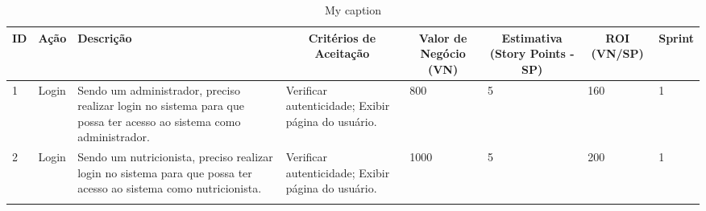 \begin{table}[]
\centering
\caption{My caption}
\label{my-label}
\begin{tabular}{llllllll}
\hline
\multicolumn{1}{c}{\textbf{ID}} & \multicolumn{1}{c}{\textbf{Ação}} & \textbf{Descrição}                                                                                                 & \multicolumn{1}{c}{\textbf{Critérios de Aceitação}} & \multicolumn{1}{c}{\textbf{Valor de Negócio (VN)}} & \multicolumn{1}{c}{\textbf{Estimativa (Story Points - SP)}} & \multicolumn{1}{c}{\textbf{ROI (VN/SP)}} & \multicolumn{1}{c}{\textbf{Sprint}} \\ \hline
1                               & Login                             & Sendo um administrador, preciso realizar login no sistema para que possa ter acesso ao sistema como administrador. & Verificar autenticidade; Exibir página do usuário.  & 800                                                & 5                                                           & 160                                      & 1                                   \\ \hline
2                               & Login                             & Sendo um nutricionista, preciso realizar login no sistema para que possa ter acesso ao sistema como nutricionista. & Verificar autenticidade; Exibir página do usuário.  & 1000                                               & 5                                                           & 200                                      & 1                                   \\ \hline
                                &                                   &                                                                                                                    &                                                     &                                                    &                                                             &                                          &                                     \\ \hline
\end{tabular}
\end{table}